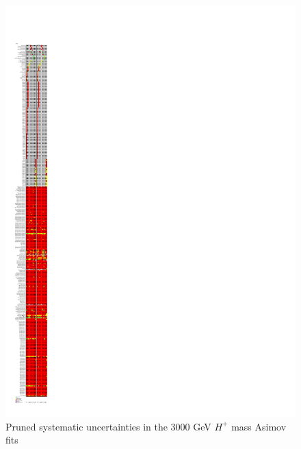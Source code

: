 \begin{figure}[H]
  \centering
  \includegraphics[keepaspectratio, scale=0.85]{images/Pruning/Pruning_Asimov_Hp3000_Contained80_DL1r_70.pdf}
  \caption{Pruned systematic uncertainties in the 3000 GeV $H^{+}$ mass Asimov fits}
  \label{fig:Pruning_Asimov_Hp3000_Contained80_DL1r_70}
\end{figure}

